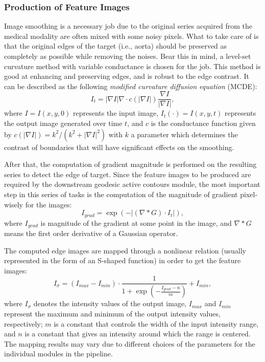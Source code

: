 \subsubsection{Production of Feature Images}

Image smoothing is a necessary job due to the original series acquired from the medical modality are often mixed with some noisy pixels.
What to take care of is that the original edges of the target (i.e., aorta) should be preserved as completely as possible while removing the noises.
Bear this in mind, a level-set curvature method with variable conductance \cite{Whitaker2001} is chosen for the job.
This method is good at enhancing and preserving edges, and is robust to the edge contrast.
It can be described as the following \emph{modified curvature diffusion equation} (MCDE):
\begin{equation}
\label{eqn:MCDE}
I_t = |\nabla I| \nabla \cdot c(|\nabla I|) \frac{\nabla I}{|\nabla I|},
\end{equation}
where $I = I(x, y, 0)$ represents the input image, $I_t(\cdot) = I(x, y, t)$ represents the output image generated over time $t$, and $c$ is the conductance function given by
$c(|\nabla I|) = k^2/(k^2 + |\nabla I|^2)$ with $k$ a parameter which determines the contrast of boundaries that will have significant effects on the smoothing.

After that, the computation of gradient magnitude is performed on the resulting series to detect the edge of target.
Since the feature images to be produced are required by the downstream geodesic active contours module, the most important step in this series of tasks is the computation of the magnitude of gradient pixel-wisely for the images:
\begin{equation}
\label{eqn:Gaussian}
I_{grad} = \exp(-|(\nabla \ast G) \cdot I_t|),
\end{equation}
where $I_{grad}$ is magnitude of the gradient at some point in the image, and $\nabla \ast G$ means the first order derivative of a Gaussian operator.

The computed edge images are mapped through a nonlinear relation (usually represented in the form of an S-shaped function) in order to get the feature images:
\begin{equation}
\label{eqn:Sigmoid}
I_{\sigma} = (I_{max} - I_{min}) \cdot \frac{1}{1 + \exp\left(-\frac{I_{grad} - n}{m}\right)} + I_{min},
\end{equation}
where $I_{\sigma}$ denotes the intensity values of the output image, $I_{max}$ and $I_{min}$ represent the maximum and minimum of the output intensity values, respectively; $m$ is a constant that controls the width of the input intensity range, and $n$ is a constant that gives an intensity around which the range is centered.
The mapping results may vary due to different choices of the parameters for the individual modules in the pipeline.

